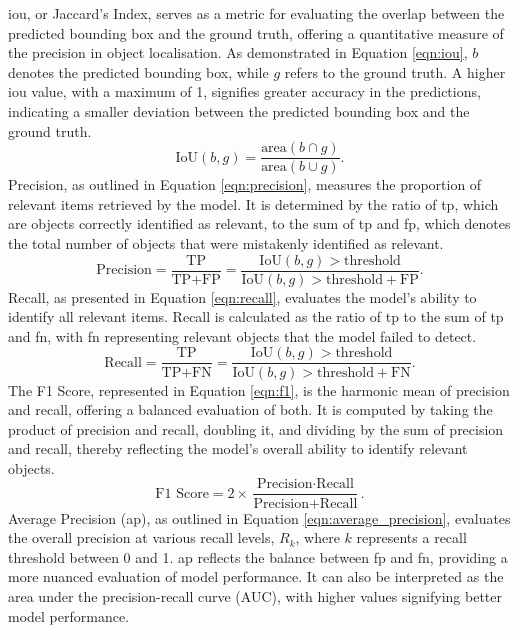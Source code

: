 \gls{iou}, or Jaccard’s Index, serves as a metric for evaluating the overlap between the predicted bounding box and the ground truth, offering a quantitative measure of the precision in object localisation. As demonstrated in Equation \ref{eqn:iou}, $b$ denotes the predicted bounding box, while $g$ refers to the ground truth. A higher \gls{iou} value, with a maximum of 1, signifies greater accuracy in the predictions, indicating a smaller deviation between the predicted bounding box and the ground truth.
\begin{equation}
\label{eqn:iou}
\text{IoU}(b, g) = \frac{{\text{area}(b \cap g)}}{{\text{area}(b \cup g)}}.
\end{equation}
Precision, as outlined in Equation \ref{eqn:precision}, measures the proportion of relevant items retrieved by the model. It is determined by the ratio of \gls{tp}, which are objects correctly identified as relevant, to the sum of \gls{tp} and \gls{fp}, which denotes the total number of objects that were mistakenly identified as relevant.
\begin{equation}
\text{Precision} = \frac{\text{TP}}{\text{TP} + \text{FP}} = \frac{\text{IoU}(b, g) > \text{threshold}}{\text{IoU}(b, g) > \text{threshold} + \text{FP}}.
\label{eqn:precision}
\end{equation}
\noindent
Recall, as presented in Equation \ref{eqn:recall}, evaluates the model's ability to identify all relevant items. Recall is calculated as the ratio of \gls{tp} to the sum of \gls{tp} and \gls{fn}, with \gls{fn} representing relevant objects that the model failed to detect.
\begin{equation}
\text{Recall} = \frac{\text{TP}}{\text{TP} + \text{FN}} = \frac{\text{IoU}(b, g) > \text{threshold}}{\text{IoU}(b, g) > \text{threshold} + \text{FN}}.
\label{eqn:recall}
\end{equation}
\noindent
The F1 Score, represented in Equation \ref{eqn:f1}, is the harmonic mean of precision and recall, offering a balanced evaluation of both. It is computed by taking the product of precision and recall, doubling it, and dividing by the sum of precision and recall, thereby reflecting the model's overall ability to identify relevant objects.
\begin{equation}
\text{F1 Score} = 2 \times \frac{\text{Precision} \cdot \text{Recall}}{\text{Precision} + \text{Recall}}.
\label{eqn:f1}
\end{equation}
\noindent
Average Precision (\gls{ap}), as outlined in Equation \ref{eqn:average_precision}, evaluates the overall precision at various recall levels, \( R_k \), where \( k \) represents a recall threshold between 0 and 1. \gls{ap} reflects the balance between \gls{fp} and \gls{fn}, providing a more nuanced evaluation of model performance. It can also be interpreted as the area under the precision-recall curve (AUC), with higher values signifying better model performance.
